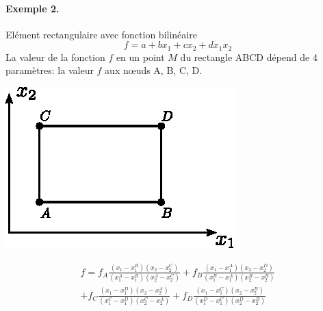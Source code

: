 \paragraph{Exemple 2.} 
\begin{multicols}{2}
Elément rectangulaire avec fonction bilinéaire 
\[
f = a +b x_1+cx_2 +dx_1x_2
\]
La valeur de la fonction $f$ en un point $M$ du rectangle ABCD dépend de 4 paramètres: la valeur $f$ aux nœuds A, B, C, D. 
\columnbreak
\begin{center}
    \includegraphics{../images/T1_Ch09-03}
\end{center}
\end{multicols}
\begin{multline}
    f = f_A \frac{(x_1 - x_1^B)(x_2 -x_2^C)}{(x_1^A - x_1^B)(x_2^A-x_2^C)} +  f_B \frac{(x_1 - x_1^A)(x_2 -x_2^D)}{(x_1^B - x_1^A)(x_2^B-x_2^B)} \\
    + f_C \frac{(x_1 - x_1^D)(x_2 -x_2^A)}{(x_1^C - x_1^D)(x_2^C-x_2^A)} + f_D \frac{(x_1 - x_1^C)(x_2 -x_2^B)}{(x_1^D - x_1^C)(x_2^D-x_2^B)}
    \label{eq:Ch09-065} 
\end{multline}

